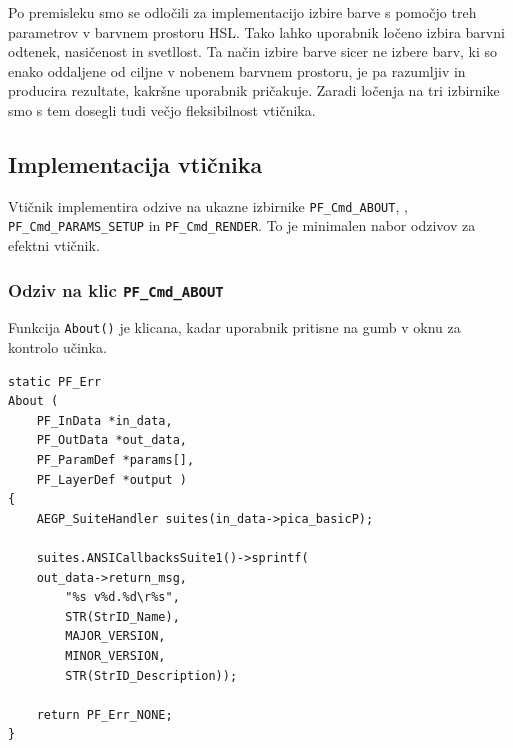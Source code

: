 \documentclass[a4paper, 12pt]{book}
\begin{document}
Po premisleku smo se odločili za implementacijo izbire barve s pomočjo treh parametrov v barvnem prostoru HSL\cite{colordiff1}.
Tako lahko uporabnik ločeno izbira barvni odtenek, nasičenost in svetllost.
Ta način izbire barve sicer ne izbere barv, ki so enako oddaljene od ciljne v nobenem barvnem prostoru, je pa razumljiv in producira rezultate, kakršne uporabnik pričakuje.
Zaradi ločenja na tri izbirnike smo s tem dosegli tudi večjo fleksibilnost vtičnika.


\subsection{Implementacija vtičnika}

Vtičnik implementira odzive na ukazne izbirnike \texttt{PF\_Cmd\_ABOUT}, , \texttt{PF\_Cmd\_PARAMS\_SETUP} in \texttt{PF\_Cmd\_RENDER}.
To je minimalen nabor odzivov za efektni vtičnik.


\subsubsection{Odziv na klic \texttt{PF\_Cmd\_ABOUT}}
Funkcija \texttt{About()} je klicana, kadar uporabnik pritisne na gumb  v oknu za kontrolo učinka.
\begin{verbatim}
static PF_Err 
About (	
    PF_InData *in_data,
    PF_OutData *out_data,
    PF_ParamDef *params[],
    PF_LayerDef *output )
{
    AEGP_SuiteHandler suites(in_data->pica_basicP);
	
    suites.ANSICallbacksSuite1()->sprintf(
    out_data->return_msg,
        "%s v%d.%d\r%s",
        STR(StrID_Name), 
        MAJOR_VERSION, 
        MINOR_VERSION, 
        STR(StrID_Description));

    return PF_Err_NONE;
}
\end{verbatim}
\end{document}
